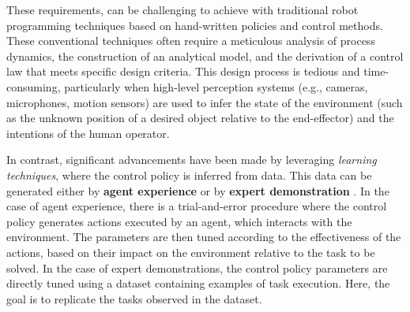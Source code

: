 These requirements, can be challenging to achieve with traditional robot programming techniques based on hand-written policies and control methods. These conventional techniques often require a meticulous analysis of process dynamics, the construction of an analytical model, and the derivation of a control law that meets specific design criteria. This design process is tedious and time-consuming, particularly when high-level perception systems (e.g., cameras, microphones, motion sensors) are used to infer the state of the environment (such as the unknown position of a desired object relative to the end-effector) and the intentions of the human operator.

In contrast, significant advancements have been made by leveraging \textit{learning techniques}, where the control policy is inferred from data. This data can be generated either by \textbf{agent experience} \cite{sutton2018reinforcement} or by \textbf{expert demonstration} \cite{osa2018algorithmic}. 
\newline In the case of agent experience, there is a trial-and-error procedure where the control policy generates actions executed by an agent, which interacts with the environment. The parameters are then tuned according to the effectiveness of the actions, based on their impact on the environment relative to the task to be solved. 
\newline In the case of expert demonstrations, the control policy parameters are directly tuned using a dataset containing examples of task execution. Here, the goal is to replicate the tasks observed in the dataset.

